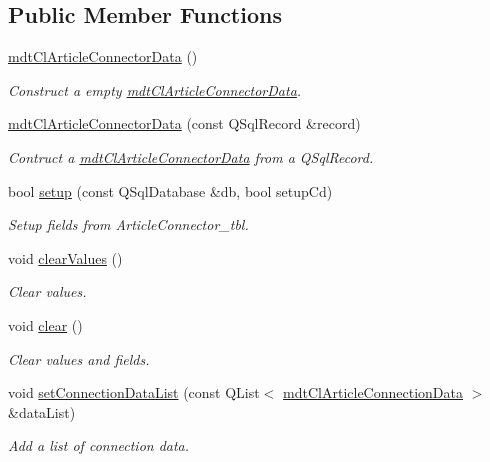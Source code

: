 \subsection*{Public Member Functions}
\begin{DoxyCompactItemize}
\item 
\hyperlink{classmdt_cl_article_connector_data_abf1822300bf3ea388abee0a0d6732e6a}{mdt\-Cl\-Article\-Connector\-Data} ()
\begin{DoxyCompactList}\small\item\em Construct a empty \hyperlink{classmdt_cl_article_connector_data}{mdt\-Cl\-Article\-Connector\-Data}. \end{DoxyCompactList}\item 
\hyperlink{classmdt_cl_article_connector_data_a3a967b47ca629567f19ed542c6e2ce05}{mdt\-Cl\-Article\-Connector\-Data} (const Q\-Sql\-Record \&record)
\begin{DoxyCompactList}\small\item\em Contruct a \hyperlink{classmdt_cl_article_connector_data}{mdt\-Cl\-Article\-Connector\-Data} from a Q\-Sql\-Record. \end{DoxyCompactList}\item 
bool \hyperlink{classmdt_cl_article_connector_data_a652df1f49424aee174a20df109f05d90}{setup} (const Q\-Sql\-Database \&db, bool setup\-Cd)
\begin{DoxyCompactList}\small\item\em Setup fields from Article\-Connector\-\_\-tbl. \end{DoxyCompactList}\item 
void \hyperlink{classmdt_cl_article_connector_data_aeaacf0004607ce3c4f0908af538c900d}{clear\-Values} ()
\begin{DoxyCompactList}\small\item\em Clear values. \end{DoxyCompactList}\item 
void \hyperlink{classmdt_cl_article_connector_data_a0ef0711ad63b3e80b54f9ddd3fd6e218}{clear} ()
\begin{DoxyCompactList}\small\item\em Clear values and fields. \end{DoxyCompactList}\item 
void \hyperlink{classmdt_cl_article_connector_data_ac2825245373ab0376c763c14a792c4d9}{set\-Connection\-Data\-List} (const Q\-List$<$ \hyperlink{classmdt_cl_article_connection_data}{mdt\-Cl\-Article\-Connection\-Data} $>$ \&data\-List)
\begin{DoxyCompactList}\small\item\em Add a list of connection data. \end{DoxyCompactList}\item 

\end{DoxyCompactItemize}
